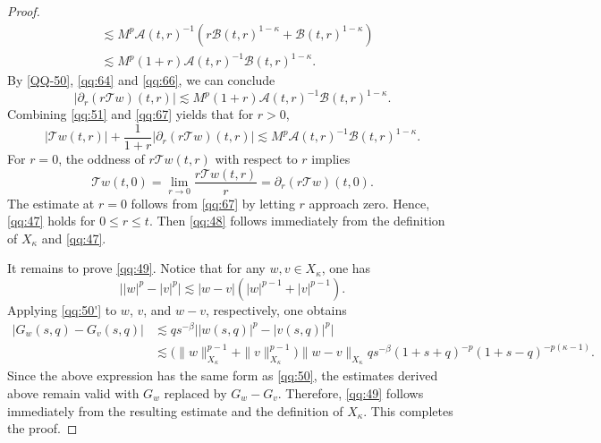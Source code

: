 \documentclass[10pt,a4paper]{amsart}
\newcommand{\Acal}{\mathcal A}
\newcommand{\Bcal}{\mathcal B}
\newcommand{\Tcal}{\mathcal T}
\begin{document}
\begin{proof}
\begin{equation}
\begin{aligned}
&\lesssim
M^p\Acal(t,r)^{-1}
\left(
r\Bcal(t,r)^{1-\kappa}
+\Bcal(t,r)^{1-\kappa}
\right)\\
&\lesssim
M^p(1+r)
\Acal(t,r)^{-1}
\Bcal(t,r)^{1-\kappa}.
\end{aligned}
\end{equation}
By \eqref{QQ-50}, \eqref{qq:64} and
\eqref{qq:66}, we can conclude
\begin{equation}
\label{qq:67}
\left|
\partial_r(r\Tcal w)(t,r)
\right|
\lesssim
M^p(1+r)
\Acal(t,r)^{-1}
\Bcal(t,r)^{1-\kappa}.
\end{equation}
Combining \eqref{qq:51} and \eqref{qq:67} yields that for $r>0$,
\begin{equation}
\label{qq:68}
|\Tcal w(t,r)|
+\frac1{1+r}
\left|
\partial_r(r\Tcal w)(t,r)
\right|
\lesssim
M^p
\Acal(t,r)^{-1}
\Bcal(t,r)^{1-\kappa}.
\end{equation}
For $r=0$, the oddness of $r\Tcal w(t,r)$ with respect to $r$
implies
\[
\Tcal w(t,0)
=\lim_{r\to0}
\frac{r\Tcal w(t,r)}{r}
=\partial_r(r\Tcal w)(t,0).
\]
The estimate at $r=0$ follows from \eqref{qq:67} by letting
$r$ approach zero.
Hence, \eqref{qq:47} holds for $0\leq r\leq t$.
Then \eqref{qq:48} follows immediately from the definition of
$X_\kappa$ and \eqref{qq:47}.

It remains to prove \eqref{qq:49}. Notice that for any $w,v\in X_\kappa$, one has
\[
\bigl||w|^p-|v|^p\bigr|
\lesssim
|w-v|
\left(
|w|^{p-1}
+|v|^{p-1}
\right).
\]
Applying \eqref{qq:50'} to $w$, $v$, and $w-v$, respectively,
one obtains
\[
\begin{aligned}
|G_w(s,q)-G_v(s,q)|
&\lesssim
q s^{-\beta}
\bigl||w(s,q)|^p-|v(s,q)|^p\bigr|
\\
&\lesssim
\big(\|w\|_{X_\kappa}^{p-1}
+\|v\|_{X_\kappa}^{p-1}
\big)
\|w-v\|_{X_\kappa}
q s^{-\beta}
(1+s+q)^{-p}
(1+s-q)^{-p(\kappa-1)}.
\end{aligned}
\]
Since the above expression has the same form as \eqref{qq:50},
the estimates derived above remain valid with $G_w$ replaced by
$G_w-G_v$.
Therefore, \eqref{qq:49}  follows immediately from the resulting
estimate and the definition of $X_\kappa$. This completes the proof.
\end{proof}
\end{document}
